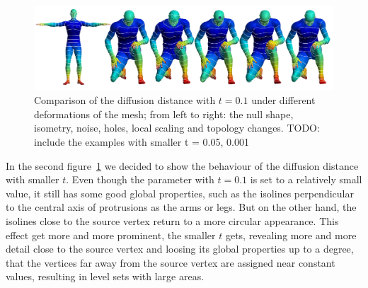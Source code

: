 \begin{figure}[h]
	\centering
	\includegraphics[width = \textwidth]{../results/diffusion_small_isolines}
	\caption{Comparison of the diffusion distance with $t = 0.1$ under different deformations of the mesh; from left to right: the null shape, isometry, noise, holes, local scaling and topology changes. TODO: include the examples with smaller t = 0.05, 0.001}
	\label{fig:diffusion_s_isolines}
\end{figure}
In the second figure~\ref{fig:diffusion_s_isolines} we decided to show the behaviour of the diffusion distance with smaller $t$.
Even though the parameter with $t= 0.1$ is set to a relatively small value, it still has some good global properties, such as the isolines perpendicular to the central axis of protrusions as the arms or legs.
But on the other hand, the isolines close to the source vertex return to a more circular appearance.
This effect get more and more prominent, the smaller $t$ gets, revealing more and more detail close to the source vertex and loosing its global properties up to a degree, that the vertices far away from the source vertex are assigned near constant values, resulting in level sets with large areas.

